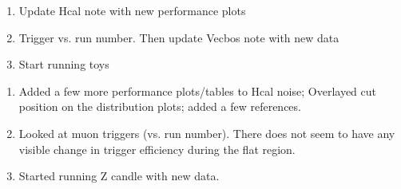 

\begin{enumerate}
\item Update Hcal note with new performance plots
\item Trigger vs. run number.  Then update Vecbos note with new data
\item Start running toys
\end{enumerate}


\begin{enumerate}
\item Added a few more performance plots/tables to Hcal noise; Overlayed cut position on the distribution plots; added a few references.
\item Looked at muon triggers (vs. run number).  There does not seem to have any visible change in trigger efficiency during the flat region.
\item Started running Z candle with new data.
\end{enumerate}


